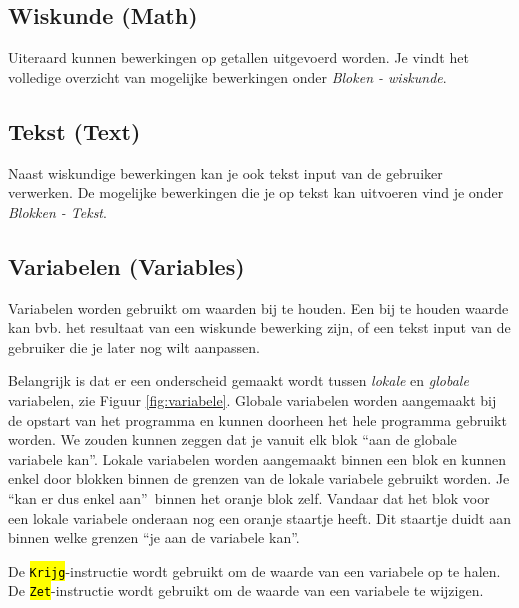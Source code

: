 \subsection{Wiskunde (Math)}
Uiteraard kunnen bewerkingen op getallen uitgevoerd worden. Je vindt het volledige overzicht van mogelijke bewerkingen onder \emph{Bloken - wiskunde}.

\subsection{Tekst (Text)}
Naast wiskundige bewerkingen kan je ook tekst input van de gebruiker verwerken. De mogelijke bewerkingen die je op tekst kan uitvoeren vind je onder \emph{Blokken - Tekst}.

\subsection{Variabelen (Variables)}
Variabelen worden gebruikt om waarden bij te houden. Een bij te houden waarde kan bvb. het resultaat van een wiskunde bewerking zijn, of een tekst input van de gebruiker die je later nog wilt aanpassen. 

Belangrijk is dat er een onderscheid gemaakt wordt tussen \emph{lokale} en \emph{globale} variabelen, zie Figuur \ref{fig:variabele}. Globale variabelen worden aangemaakt bij de opstart van het programma en kunnen doorheen het hele programma gebruikt worden. We zouden kunnen zeggen dat je vanuit elk blok \textquotedblleft aan de globale variabele kan\textquotedblright.
Lokale variabelen worden aangemaakt binnen een blok en kunnen enkel door blokken binnen de grenzen van de lokale variabele gebruikt worden. Je \textquotedblleft kan er dus enkel aan\textquotedblright \ binnen het oranje blok zelf. Vandaar dat het blok voor een lokale variabele onderaan nog een oranje staartje heeft. Dit staartje duidt aan binnen welke grenzen \textquotedblleft je aan de variabele kan\textquotedblright.


De \hl{\texttt{Krijg}}-instructie wordt gebruikt om de waarde van een variabele op te halen. De \hl{\texttt{Zet}}-instructie wordt gebruikt om de waarde van een variabele te wijzigen.


